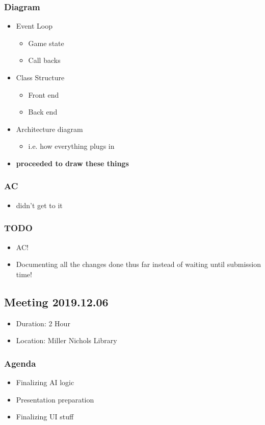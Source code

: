\documentclass[11pt]{article}
\begin{document}
\subsubsection{Diagram}
\label{sec:orgcba41ba}
\begin{itemize}
\item Event Loop
\begin{itemize}
\item Game state
\item Call backs
\end{itemize}
\item Class Structure
\begin{itemize}
\item Front end
\item Back end
\end{itemize}
\item Architecture diagram
\begin{itemize}
\item i.e. how everything plugs in
\end{itemize}
\item \textbf{proceeded to draw these things}
\end{itemize}
\subsubsection{AC}
\label{sec:org6d303ab}
\begin{itemize}
\item didn't get to it
\end{itemize}
\subsubsection{{\bfseries\sffamily TODO} }
\label{sec:org453c905}
\begin{itemize}
\item AC!
\item Documenting all the changes done thus far instead of waiting until submission time!
\end{itemize}
\subsection{Meeting 2019.12.06}
\label{sec:org1343cc0}
\begin{itemize}
\item Duration: 2 Hour
\item Location: Miller Nichols Library
\end{itemize}
\subsubsection{Agenda}
\label{sec:org549c032}
\begin{itemize}
\item Finalizing AI logic
\item Presentation preparation
\item Finalizing UI stuff
\end{itemize}
\end{document}
